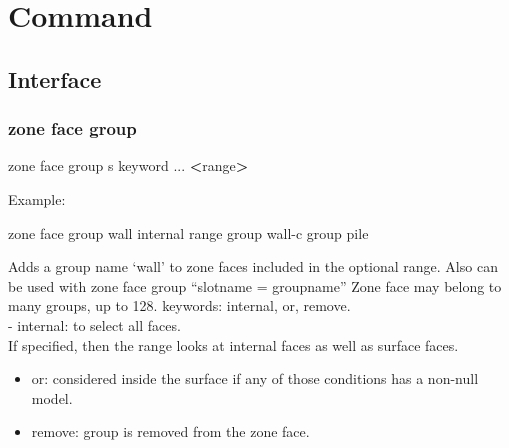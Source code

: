 \documentclass[a4paper, nobind]{templates/ociamthesis}
\newenvironment{Shaded}{\begin{snugshade}}{\end{snugshade}}
\newcommand{\BuiltInTok}[1]{#1}
\newcommand{\NormalTok}[1]{#1}
\newcommand{\OperatorTok}[1]{\textcolor[rgb]{0.81,0.36,0.00}{\textbf{#1}}}
\newcommand{\StringTok}[1]{\textcolor[rgb]{0.31,0.60,0.02}{#1}}
\renewenvironment{Shaded}
{
  \vspace{10pt}%
  \begin{snugshade}%
}{%
  \end{snugshade}%
  \vspace{8pt}%
}
\begin{document}
\hypertarget{command}{%
\chapter{Command}\label{command}}

\hypertarget{interface-3}{%
\section{Interface}\label{interface-3}}

\hypertarget{zone-face-group}{%
\subsection{zone face group}\label{zone-face-group}}

\begin{Shaded}
\begin{Highlighting}[]
\NormalTok{zone face group s keyword ... }\OperatorTok{\textless{}}\BuiltInTok{range}\OperatorTok{\textgreater{}} 
\end{Highlighting}
\end{Shaded}

Example:

\begin{Shaded}
\begin{Highlighting}[]
\NormalTok{zone face group }\StringTok{\textquotesingle{}wall\textquotesingle{}}\NormalTok{ internal }\BuiltInTok{range}\NormalTok{ group }\StringTok{\textquotesingle{}wall{-}c\textquotesingle{}}\NormalTok{ group }\StringTok{\textquotesingle{}pile\textquotesingle{}}
\end{Highlighting}
\end{Shaded}

Adds a group name `wall' to zone faces included in the optional range.
Also can be used with zone face group ``slotname = groupname'' Zone face
may belong to many groups, up to 128. keywords: internal, or, remove.\\
- internal: to select all faces.\\
If specified, then the range looks at internal faces as well as surface
faces.

\begin{itemize}
\item
  or: considered inside the surface if any of those conditions has a
  non-null model.
\item
  remove: group is removed from the zone face.
\end{itemize}
\end{document}
